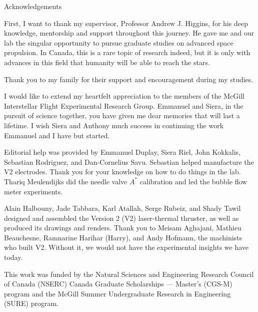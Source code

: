 \begin{plainchp}{Acknowledgements}
    
    First, I want to thank my supervisor, Professor Andrew J. Higgins, for his deep knowledge, mentorship and support throughout this journey. He gave me and our lab the singular opportunity to pursue graduate studies on advanced space propulsion. In Canada, this is a rare topic of research indeed, but it is only with advances in this field that humanity will be able to reach the stars.

    Thank you to my family for their support and encouragement during my studies.

    I would like to extend my heartfelt appreciation to the members of the McGill Interstellar Flight Experimental Research Group. Emmanuel and Siera, in the pursuit of science together, you have given me dear memories that will last a lifetime. I wish Siera and Anthony much success in continuing the work Emmanuel and I have but started.

    Editorial help was provided by Emmanuel Duplay, Siera Riel, John Kokkalis, Sebastian Rodriguez, and Dan-Cornelius Savu. Sebastian helped manufacture the V2 electrodes. Thank you for your knowledge on how to do things in the lab. Thariq Meulendijks did the needle valve $A^*$ calibration and led the bubble flow meter experiments.

    Alain Halbouny, Jade Tabbara, Karl Atallah, Serge Rubeiz, and Shady Tawil designed and assembled the Version 2 (V2) laser-thermal thruster, as well as produced its drawings and renders. Thank you to Meisam Aghajani, Mathieu Beauchesne, Ramnarine Harihar (Harry), and Andy Hofmann, the machinists who built V2. Without it, we would not have the experimental insights we have today.

    This work was funded by the Natural Sciences and Engineering Research Council of Canada (NSERC) Canada Graduate Scholarships — Master's (CGS-M) program and the McGill Summer Undergraduate Research in Engineering (SURE) program.

\end{plainchp}